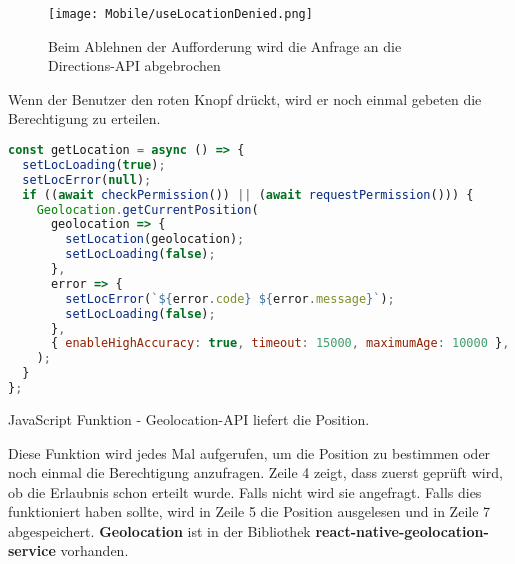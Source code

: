 \begin{figure}[H]
  \begin{center}
    \texttt{[image: Mobile/useLocationDenied.png]}
    \caption{Beim Ablehnen der Aufforderung wird die Anfrage an die Directions-API abgebrochen}
  \end{center}
\end{figure}

Wenn der Benutzer den roten Knopf drückt, wird er noch einmal gebeten die Berechtigung zu erteilen.

\newpage

\begin{code}[htp]
\begin{lstlisting}[firstnumber=1,language=JavaScript, style=JSX]
const getLocation = async () => {
  setLocLoading(true);
  setLocError(null);
  if ((await checkPermission()) || (await requestPermission())) {
    Geolocation.getCurrentPosition(
      geolocation => {
        setLocation(geolocation);
        setLocLoading(false);
      },
      error => {
        setLocError(`${error.code} ${error.message}`);
        setLocLoading(false);
      },
      { enableHighAccuracy: true, timeout: 15000, maximumAge: 10000 },
    );
  }
};
\end{lstlisting}
\caption{JavaScript Funktion - Geolocation-API liefert die Position.}
\end{code}

Diese Funktion wird jedes Mal aufgerufen, um die Position zu bestimmen oder noch einmal die
Berechtigung anzufragen. Zeile 4 zeigt, dass zuerst geprüft wird, ob die Erlaubnis schon erteilt
wurde. Falls nicht wird sie angefragt. Falls dies funktioniert haben sollte, wird in Zeile 5 die
Position ausgelesen und in Zeile 7 abgespeichert. \textbf{Geolocation} ist in der Bibliothek
\textbf{react-native-geolocation-service} vorhanden.
